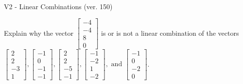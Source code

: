 \begin{exercise}
  \begin{exerciseTitle}V2 - Linear Combinations (ver. 150)\end{exerciseTitle}
  \begin{exerciseStatement}
    Explain why the vector \(\left[\begin{array}{c}
-4 \\
-4 \\
8 \\
0
\end{array}\right]\)  is or is not a linear 
	combination of the vectors \(\left[\begin{array}{c}
2 \\
2 \\
-3 \\
1
\end{array}\right] , \left[\begin{array}{c}
-1 \\
0 \\
-1 \\
-1
\end{array}\right] , \left[\begin{array}{c}
2 \\
2 \\
-5 \\
-1
\end{array}\right] , \left[\begin{array}{c}
-1 \\
-2 \\
1 \\
-2
\end{array}\right] , \text{ and } \left[\begin{array}{c}
-1 \\
0 \\
-2 \\
0
\end{array}\right]\).
	



\end{exerciseStatement}
\end{exercise}
